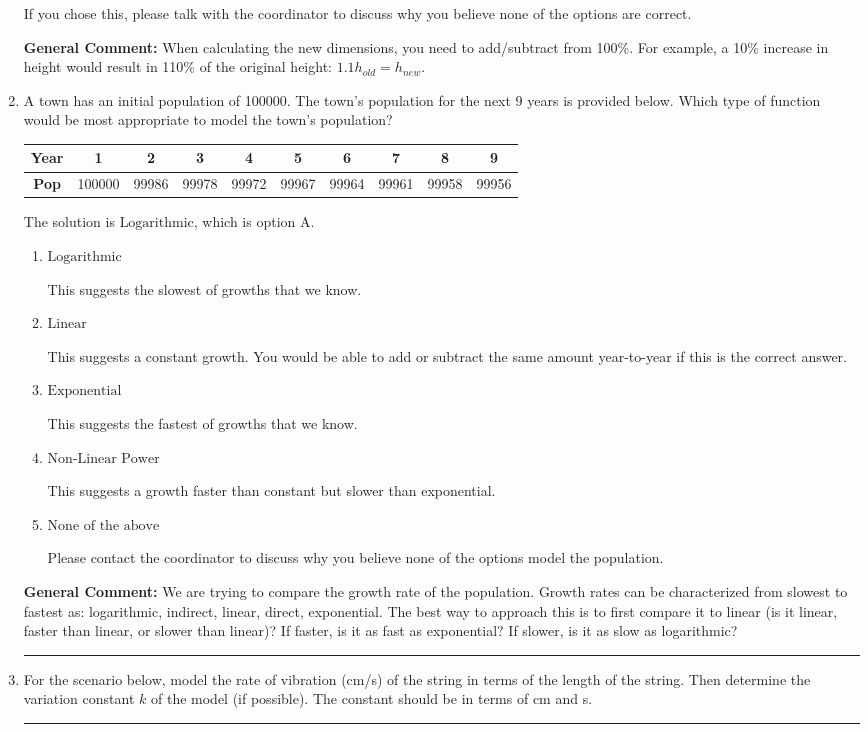 \documentclass{extbook}[14pt]
\newcommand{\litem}[1]{\item #1

\rule{\textwidth}{0.4pt}}
\begin{document}
\begin{enumerate}
{\begin{enumerate}[label=\Alph*.]
If you chose this, please talk with the coordinator to discuss why you believe none of the options are correct.
\end{enumerate}

\textbf{General Comment:} When calculating the new dimensions, you need to add/subtract from 100\%. For example, a 10\% increase in height would result in 110\% of the original height: $1.1h_{old} = h_{new}$.
}
\litem{
A town has an initial population of 100000. The town's population for the next 9 years is provided below. Which type of function would be most appropriate to model the town's population?


\begin{tabular}{c|c|c|c|c|c|c|c|c|c}
\textbf{Year} &1 &2 &3 &4 &5 &6 &7 &8 &9\tabularnewline \hline
\textbf{Pop} &100000 &99986 &99978 &99972 &99967 &99964 &99961 &99958 &99956\end{tabular}The solution is \( \text{Logarithmic} \), which is option A.\begin{enumerate}[label=\Alph*.]
\item \( \text{Logarithmic} \)

This suggests the slowest of growths that we know.
\item \( \text{Linear} \)

This suggests a constant growth. You would be able to add or subtract the same amount year-to-year if this is the correct answer.
\item \( \text{Exponential} \)

This suggests the fastest of growths that we know.
\item \( \text{Non-Linear Power} \)

This suggests a growth faster than constant but slower than exponential.
\item \( \text{None of the above} \)

Please contact the coordinator to discuss why you believe none of the options model the population.
\end{enumerate}

\textbf{General Comment:} We are trying to compare the growth rate of the population. Growth rates can be characterized from slowest to fastest as: logarithmic, indirect, linear, direct, exponential. The best way to approach this is to first compare it to linear (is it linear, faster than linear, or slower than linear)? If faster, is it as fast as exponential? If slower, is it as slow as logarithmic?
}
\litem{
For the scenario below, model the rate of vibration (cm/s) of the string in terms of the length of the string. Then determine the variation constant $k$ of the model (if possible). The constant should be in terms of cm and s.

}
\end{enumerate}
\end{document}
